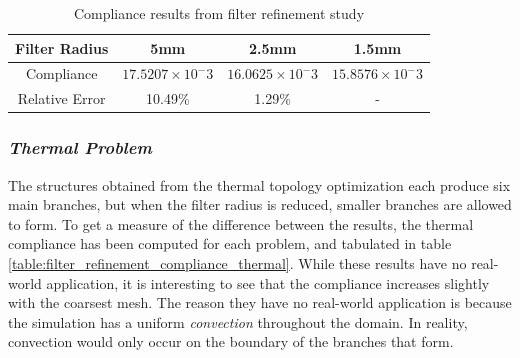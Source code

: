 \begin{table}[ht]
  \centering
  \begin{tabular}{c | c | c | c}
    Filter Radius & 5mm & 2.5mm & 1.5mm \\ \hline
    Compliance & $17.5207\times 10^-3$ & $16.0625\times 10^-3$ & $15.8576\times 10^-3$ \\ \hline
    Relative Error & 10.49\% & 1.29\% & - \\ \hline
  \end{tabular}
  \caption{Compliance results from filter refinement study}
  \label{table:filter_refinement_compliance}
\end{table}

\subsubsection*{\emph{Thermal Problem}}
The structures obtained from the thermal topology optimization each produce six main branches, but when the filter radius is reduced, smaller branches are allowed to form. To get a measure of the difference between the results, the thermal compliance has been computed for each problem, and tabulated in table \ref{table:filter_refinement_compliance_thermal}. While these results have no real-world application, it is interesting to see that the compliance increases slightly with the coarsest mesh. The reason they have no real-world application is because the simulation has a uniform \emph{convection} throughout the domain. In reality, convection would only occur on the boundary of the branches that form. 
